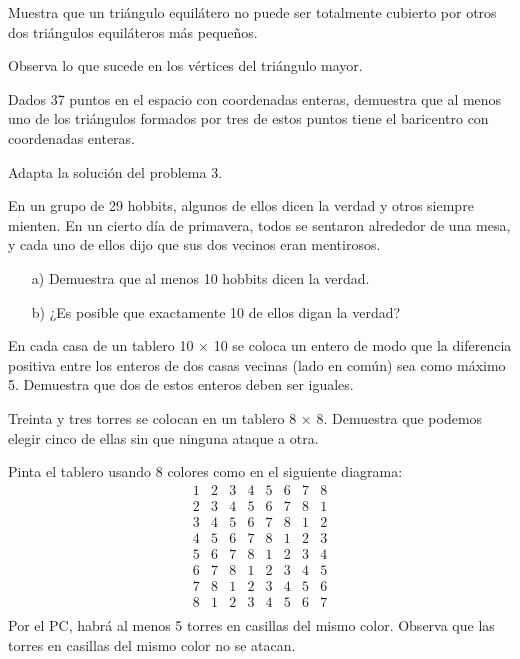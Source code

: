 \documentclass[11pt]{scrartcl}
\begin{document}
\begin{problem}
Muestra que un triángulo equilátero no puede ser totalmente cubierto por otros dos triángulos equiláteros más pequeños.
\begin{hint}
Observa lo que sucede en los vértices del triángulo mayor.
\end{hint}
\end{problem}

\begin{problem} Dados 37 puntos en el espacio con coordenadas enteras, demuestra que al menos uno de los triángulos formados por tres de estos puntos tiene el baricentro con coordenadas enteras.
\begin{hint}
Adapta la solución del problema 3.
\end{hint}
\end{problem}

\begin{problem}[Bielorrusia 1996] En un grupo de 29 hobbits, algunos de ellos dicen la verdad y otros siempre mienten. En un cierto día de primavera, todos se sentaron alrededor de una mesa, y cada uno de ellos dijo que sus dos vecinos eran mentirosos.
\begin{itemize}
    \item[a)] Demuestra que al menos 10 hobbits dicen la verdad.
    \item[b)] ¿Es posible que exactamente 10 de ellos digan la verdad?
\end{itemize}
\end{problem}

\begin{problem}
En cada casa de un tablero 10 $\times$ 10 se coloca un entero de modo que la diferencia positiva entre los enteros de dos casas vecinas (lado en común) sea como máximo 5. Demuestra que dos de estos enteros deben ser iguales.
\end{problem}

\begin{problem}
Treinta y tres torres se colocan en un tablero 8 $\times$ 8. Demuestra que podemos elegir cinco de ellas sin que ninguna ataque a otra.
\begin{hint}
Pinta el tablero usando 8 colores como en el siguiente diagrama:
\[
\begin{matrix}
1 & 2 & 3 & 4 & 5 & 6 & 7 & 8 \\
2 & 3 & 4 & 5 & 6 & 7 & 8 & 1 \\
3 & 4 & 5 & 6 & 7 & 8 & 1 & 2 \\
4 & 5 & 6 & 7 & 8 & 1 & 2 & 3 \\
5 & 6 & 7 & 8 & 1 & 2 & 3 & 4 \\
6 & 7 & 8 & 1 & 2 & 3 & 4 & 5 \\
7 & 8 & 1 & 2 & 3 & 4 & 5 & 6 \\
8 & 1 & 2 & 3 & 4 & 5 & 6 & 7 \\
\end{matrix}
\]
Por el PC, habrá al menos 5 torres en casillas del mismo color. Observa que las torres en casillas del mismo color no se atacan.
\end{hint}
\end{problem}
\end{document}
